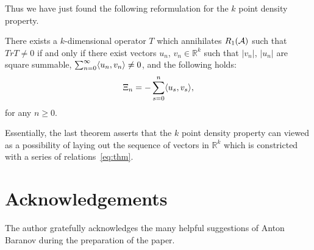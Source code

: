 \documentclass[12pt]{amsart}
\theoremstyle{case}
\begin{document}
  Thus we have just found the following reformulation for the $k$ point density property.
  \begin{prop}
    \label{prop:kreformulation}
    There exists a $k$-dimensional operator $T$ which annihilates $R_1(\cal{A})$
      such that $Tr T \neq 0$ if and only if
      there exist vectors $u_n$, $v_n \in \mathbb{R}^k$ such that
      $\lvert v_n \rvert$, $\lvert u_n \rvert$ are square summable,
      $\sum_{n=0}^\infty \inner{u_n}{v_n} \neq 0$, and the following holds:
      \begin{equation}
        \label{eq:thm}
        \Xi_n = -\sum_{s=0}^n \inner{u_s}{v_s},
      \end{equation}
      for any $n \geq 0$.
  \end{prop}
  Essentially, the last theorem asserts that the $k$ point density property can viewed as a
    possibility of laying out the sequence of vectors in $\mathbb{R}^k$ which is constricted with
    a series of relations~\eqref{eq:thm}.



\section{Acknowledgements}
  The author gratefully acknowledges the many helpful suggestions of Anton Baranov during the preparation of the paper.


\end{document}
